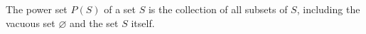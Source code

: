 The power set $P(S)$ of a set $S$ is the collection of all subsets of $S$, including the vacuous set $\varnothing$ and the set $S$ itself.

